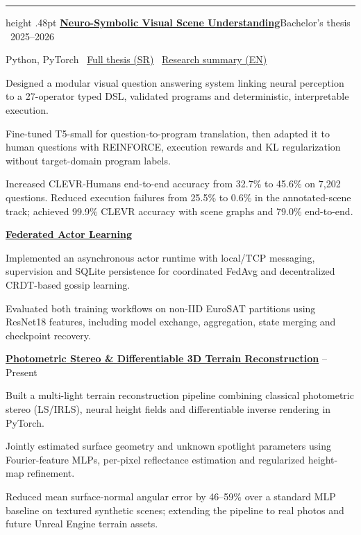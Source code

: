 \documentclass[10pt,a4paper]{article}
\newcommand{\CVText}{\fontsize{9.52}{10.85}\selectfont}
\newcommand{\CVSm}{\fontsize{9.18}{10.55}\selectfont}
\newcommand{\cvsection}[1]{\vspace{5.5pt}\noindent{\fontsize{11.0}{12.4}\selectfont\bfseries #1}\par\vspace{2.0pt}\hrule height .48pt\vspace{3.4pt}}
\newcommand{\entry}[2]{\noindent\textbf{#1}\hfill{\CVSm #2}\par}
\newcommand{\pbullet}[1]{\par\noindent\hspace*{2.5pt}\makebox[10pt][l]{\textbullet}\begin{minipage}[t]{\dimexpr\linewidth-15pt\relax}\raggedright\CVText #1\end{minipage}\par\vspace{0.45pt}}
\begin{document}
\cvsection{SELECTED PROJECTS \& RESEARCH}
\entry{\href{https://github.com/bgdj11/neurosymbolic-vqa}{\underline{Neuro-Symbolic Visual Scene Understanding}}}{Bachelor's thesis \textbar\ 2025--2026}
Python, PyTorch \textbar\ \href{https://github.com/bgdj11/neurosymbolic-vqa/blob/main/docs/presentation/DIPLOMSKI_RAD_BOGDAN_PDF_JUL.pdf}{\underline{Full thesis (SR)}} \textbar\ \href{https://github.com/bgdj11/neurosymbolic-vqa/blob/main/docs/one-page-summary.pdf}{\underline{Research summary (EN)}}\par
\pbullet{Designed a modular visual question answering system linking neural perception to a 27-operator typed DSL, validated programs and deterministic, interpretable execution.}
\pbullet{Fine-tuned T5-small for question-to-program translation, then adapted it to human questions with REINFORCE, execution rewards and KL regularization without target-domain program labels.}
\pbullet{Increased CLEVR-Humans end-to-end accuracy from 32.7\% to 45.6\% on 7,202 questions. Reduced execution failures from 25.5\% to 0.6\% in the annotated-scene track; achieved 99.9\% CLEVR accuracy with scene graphs and 79.0\% end-to-end.}
\vspace{2pt}
\entry{\href{https://github.com/bgdj11/federated-actor-learning}{\underline{Federated Actor Learning}}}{2026}
\pbullet{Implemented an asynchronous actor runtime with local/TCP messaging, supervision and SQLite persistence for coordinated FedAvg and decentralized CRDT-based gossip learning.}
\pbullet{Evaluated both training workflows on non-IID EuroSAT partitions using ResNet18 features, including model exchange, aggregation, state merging and checkpoint recovery.}
\vspace{2pt}
\entry{\href{https://github.com/bgdj11/photometric-stereo-reconstruction}{\underline{Photometric Stereo \& Differentiable 3D Terrain Reconstruction}}}{2026 -- Present}
\pbullet{Built a multi-light terrain reconstruction pipeline combining classical photometric stereo (LS/IRLS), neural height fields and differentiable inverse rendering in PyTorch.}
\pbullet{Jointly estimated surface geometry and unknown spotlight parameters using Fourier-feature MLPs, per-pixel reflectance estimation and regularized height-map refinement.}
\pbullet{Reduced mean surface-normal angular error by 46--59\% over a standard MLP baseline on textured synthetic scenes; extending the pipeline to real photos and future Unreal Engine terrain assets.}
\end{document}
